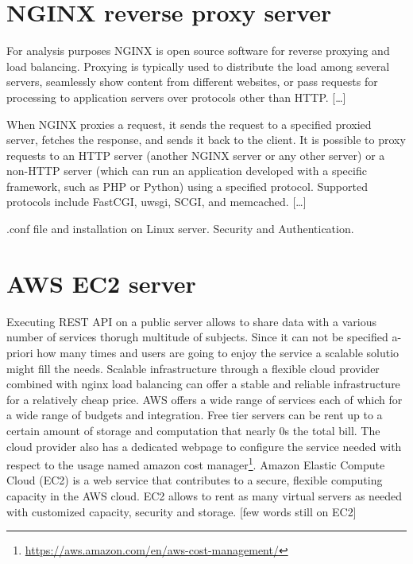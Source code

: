 \documentclass[
  12pt,
  a4paper,
  oneside]{book}
\DeclareRobustCommand{\href}[2]{#2\footnote{\url{#1}}}
\begin{document}
\hypertarget{nginx}{%
\section{NGINX reverse proxy server}\label{nginx}}

For analysis purposes NGINX is open source software for reverse proxying and load balancing.
Proxying is typically used to distribute the load among several servers, seamlessly show content from different websites, or pass requests for processing to application servers over protocols other than HTTP.
{[}\ldots{]}

When NGINX proxies a request, it sends the request to a specified proxied server, fetches the response, and sends it back to the client. It is possible to proxy requests to an HTTP server (another NGINX server or any other server) or a non-HTTP server (which can run an application developed with a specific framework, such as PHP or Python) using a specified protocol. Supported protocols include FastCGI, uwsgi, SCGI, and memcached.
{[}\ldots{]}

.conf file and installation on Linux server. Security and Authentication.

\hypertarget{aws}{%
\section{AWS EC2 server}\label{aws}}

Executing REST API on a public server allows to share data with a various number of services thorugh multitude of subjects. Since it can not be specified a-priori how many times and users are going to enjoy the service a scalable solutio might fill the needs. Scalable infrastructure through a flexible cloud provider combined with nginx load balancing can offer a stable and reliable infrastructure for a relatively cheap price.
AWS offers a wide range of services each of which for a wide range of budgets and integration. Free tier servers can be rent up to a certain amount of storage and computation that nearly 0s the total bill. The cloud provider also has a dedicated webpage to configure the service needed with respect to the usage named \href{https://aws.amazon.com/en/aws-cost-management/}{amazon cost manager}.
Amazon Elastic Compute Cloud (EC2) is a web service that contributes to a secure, flexible computing capacity in the AWS cloud. EC2 allows to rent as many virtual servers as needed with customized capacity, security and storage.
{[}few words still on EC2{]}
\end{document}
